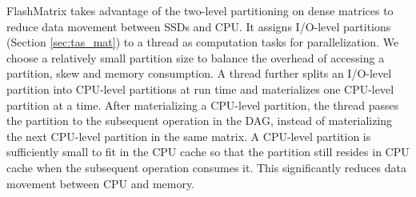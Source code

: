 
FlashMatrix takes advantage of the two-level
partitioning on dense matrices to reduce data movement between SSDs and CPU.
It assigns I/O-level partitions (Section \ref{sec:tas_mat}) to a thread as
computation tasks for parallelization. We choose a relatively small partition
size to balance the overhead of accessing a partition, skew
and memory consumption. A thread further splits an I/O-level partition into
CPU-level partitions at run time and materializes one CPU-level partition at
a time. After materializing a CPU-level partition, the thread passes the partition
to the subsequent operation in the DAG, instead of materializing the next CPU-level
partition in the same matrix. A CPU-level partition is sufficiently small
to fit in the CPU cache so that the partition still resides in CPU cache when
the subsequent operation consumes it. This significantly reduces data movement
between CPU and memory.



